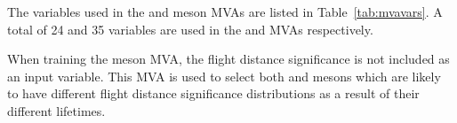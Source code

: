 The variables used in the \phiz and \Dsp meson MVAs are listed in Table~\ref{tab:mvavars}. 
A total of 24 and 35 variables are used in the \phiz and \Dsp MVAs respectively.

When training the \phiz meson MVA, the flight distance significance is not included as an input variable. This MVA is used to select both \phiz and \Dzb mesons which are likely to have different flight distance significance distributions as a result of their different lifetimes. 



